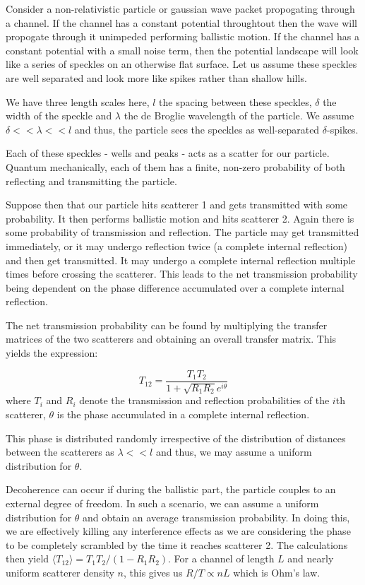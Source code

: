 \documentclass[twocolumn]{report}
\begin{document}
Consider a non-relativistic particle or gaussian wave packet propogating
through a channel. If the channel has a constant potential throughtout
then the wave will propogate through it unimpeded performing ballistic
motion. If the channel has a constant potential with a small noise
term, then the potential landscape will look like a series of speckles
on an otherwise flat surface. Let us assume these speckles are well
separated and look more like spikes rather than shallow hills.

We have three length scales here, $l$ the
spacing between these speckles, $\delta$ the width of the speckle and
$\lambda$ the de Broglie wavelength of the particle. We assume $\delta <<
\lambda << l$ and thus, the particle sees the speckles as well-separated
$\delta$-spikes.

Each of these speckles - wells and peaks - acts as a
scatter for our particle. Quantum mechanically, each of them has a
finite, non-zero probability of both reflecting and transmitting the
particle.

Suppose then that our particle hits scatterer 1 and gets
transmitted with some probability. It then performs ballistic motion and
hits scatterer 2. Again there is some probability of transmission and
reflection. The particle may get transmitted immediately, or it may
undergo reflection twice (a complete internal reflection) and then get
transmitted. It may undergo a complete internal reflection multiple times
before crossing the scatterer. This leads to the net transmission
probability being dependent on the phase difference accumulated over
a complete internal reflection.

The net transmission probability can
be found by multiplying the transfer matrices of the two scatterers and
obtaining an overall transfer matrix. This yields the expression:

\begin{equation}
    T_{12} = \frac{T_1 T_2}{1 + \sqrt{R_1 R_2} e^{i\theta}}
\end{equation}
where $T_i$ and $R_i$ denote the transmission and reflection
probabilities of the $i$th scatterer, $\theta$ is the phase accumulated
in a complete internal reflection.

This phase is distributed randomly irrespective of the distribution of
distances between the scatterers as $\lambda << l$ and thus, we may
assume a uniform distribution for $\theta$.

Decoherence can occur if during the ballistic part, the particle couples
to an external degree of freedom. In such a scenario, we can assume a
uniform distribution for $\theta$ and obtain an average transmission
probability. In doing this, we are effectively killing any interference
effects as we are considering the phase to be completely scrambled by the time
it reaches scatterer 2. The calculations then yield $\langle T_{12} \rangle
= T_1 T_2 / (1 - R_1 R_2)$. For a channel of length $L$ and nearly uniform
scatterer density $n$, this gives us $R/T \propto nL$ which is Ohm's law.
\end{document}
